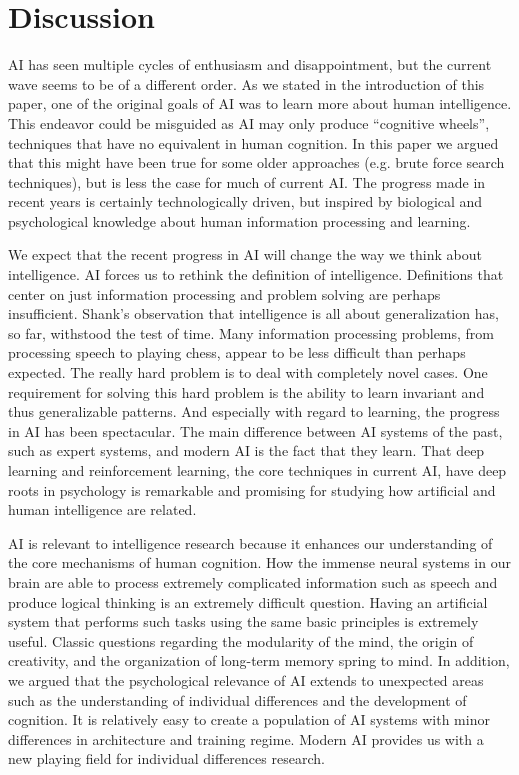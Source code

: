 \section{Discussion}

AI has seen multiple cycles of enthusiasm and disappointment, but
the current wave seems to be of a different order.
As we stated in the introduction of this paper, one of the original
goals of AI was to learn more about human intelligence.
This endeavor could be misguided as AI may only produce
``cognitive wheels'', techniques that have no equivalent in
human cognition.
In this paper we argued that this might have been true for some
older approaches (e.g. brute force search techniques), but is less
the case for much of current AI.
The progress made in recent years is certainly technologically
driven, but inspired by biological and psychological knowledge
about human information processing and learning.

We expect that the recent progress in AI will change the way we
think about intelligence.
AI forces us to rethink the definition of intelligence.
Definitions that center on just information processing and problem
solving are perhaps insufficient.
Shank's observation that intelligence is all about generalization
has, so far, withstood the test of time.
Many information processing problems, from processing speech
to playing chess, appear to be less difficult than perhaps expected.
The really hard problem is to deal with completely novel cases.
One requirement for solving this hard problem is the ability to
learn invariant and thus generalizable patterns.
And especially with regard to learning, the progress in AI has
been spectacular.
The main difference between AI systems of the past, such as expert
systems, and modern AI is the fact that they learn.
That deep learning and reinforcement learning, the core techniques
in current AI, have deep roots in psychology is remarkable and
promising for studying how artificial and human intelligence
are related.

AI is relevant to intelligence research because it enhances our
understanding of the core mechanisms of human cognition.
How the immense neural systems in our brain are able to process
extremely complicated information such as speech and produce
logical thinking is an extremely difficult question.
Having an artificial system that performs such tasks using the
same basic principles is extremely useful.
Classic questions regarding the modularity of the mind, the origin
of creativity, and the organization of long-term memory spring
to mind.
In addition, we argued that the psychological relevance of AI
extends to unexpected areas such as the understanding of
individual differences and the development of cognition.
It is relatively easy to create a population of AI systems with
minor differences in architecture and training regime.
Modern AI provides us with a new playing field for individual
differences research.

